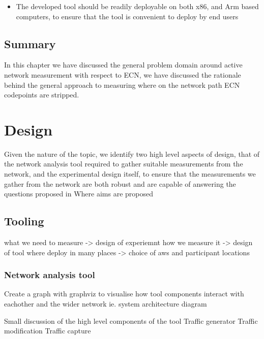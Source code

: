 \documentclass{l4proj}
\begin{document}
\begin{itemize}
    \item The developed tool should be readily deployable on both x86, and Arm based computers, to ensure that the tool is convenient to deploy by end users
\end{itemize}

\section{Summary}

In this chapter we have discussed the general problem domain around active network measurement with respect to ECN, we have discussed the rationale behind the general approach to measuring where on the network path ECN codepoints are stripped.




\chapter{Design}
\label{chap:design}

Given the nature of the topic, we identify two high level aspects of design, that of the network analysis tool required to gather suitable measurements from the network, and the experimental design itself, to ensure that the measurements we gather from the network are both robust and are capable of answering the questions proposed in {{Where aims are proposed}}

\section{Tooling}

what we need to measure -> design of experiemnt
how we measure it -> design of tool
where deploy in many places -> choice of aws and participant locations

\subsection{Network analysis tool}
{{Create a graph with graphviz to visualise how tool components interact with eachother and the wider network ie. system architecture diagram}}

{{Small discussion of the high level components of the tool}}
{{Traffic generator}}
{{Traffic modification}}
{{Traffic capture}}
\end{document}
